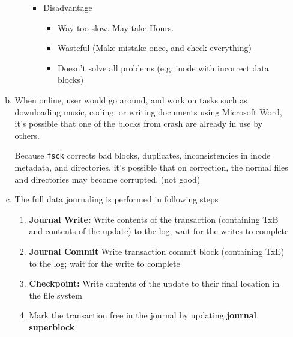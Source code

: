 \documentclass[12pt]{article}
\begin{document}
\begin{enumerate}[1.]
\begin{enumerate}[a)]
\begin{itemize}
\begin{itemize}
                \item Disadvantage
                \begin{itemize}
                    \item Way too slow. May take Hours.
                    \item Wasteful (Make mistake once, and check everything)
                    \item Doesn't solve all problems (e.g. inode with incorrect data blocks)
                \end{itemize}
            \end{itemize}
        \end{itemize}

        \item

        When online, user would go around, and work on tasks such as downloading music,
        coding, or writing documents using Microsoft Word, it's possible that one of
        the blocks from crash are already in use by others.

        \bigskip

        Because \texttt{fsck} corrects bad blocks, duplicates, inconsistencies in inode metadata, and
        directories, it's possible that on correction, the normal files and directories may become corrupted. (not good)

        \item

        \bigskip

        The full data journaling is performed in following steps

        \bigskip

        \begin{enumerate}[1.]
            \item \textbf{Journal Write:} Write contents of the transaction (containing TxB and
            contents of the update) to the log; wait for the writes to complete
            \item \textbf{Journal Commit} Write transaction commit block (containing TxE) to the log;
            wait for the write to complete
            \item \textbf{Checkpoint:} Write contents of the update to their final location in the
            file system
            \item Mark the transaction free in the journal by updating \textbf{journal superblock}
        \end{enumerate}


\end{enumerate}
\end{enumerate}
\end{document}
